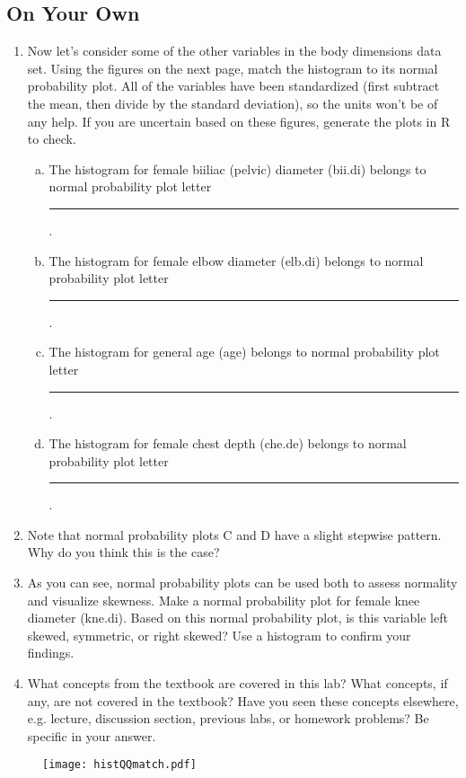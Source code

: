 \documentclass{article}\usepackage[]{graphicx}\usepackage[]{color}
\newcommand{\hlstd}[1]{\textcolor[rgb]{0.345,0.345,0.345}{#1}}%
\begin{document}
\vspace{2cm}

\subsection*{On Your Own}

\begin{enumerate}

\item Now let's consider some of the other variables in the body dimensions data set.  Using the figures on the next page, match the histogram to its normal probability plot.  All of the variables have been standardized (first subtract the mean, then divide by the standard deviation), so the units won't be of any help.  If you are uncertain based on these figures, generate the plots in R to check.

\begin{enumerate}[(a)]

\item The histogram for female biiliac (pelvic) diameter (\hlstd{bii.di}) belongs to normal probability plot letter \rule{0.25in}{1pt}.

\item The histogram for female elbow diameter (\hlstd{elb.di}) belongs to normal probability plot letter \rule{0.25in}{1pt}.

\item The histogram for general age (\hlstd{age}) belongs to normal probability plot letter \rule{0.25in}{1pt}.

\item The histogram for female chest depth (\hlstd{che.de}) belongs to normal probability plot letter \rule{0.25in}{1pt}.

\end{enumerate}

\item Note that normal probability plots C and D have a slight stepwise pattern.  Why do you think this is the case?

\item As you can see, normal probability plots can be used both to assess normality and visualize skewness.  Make a normal probability plot for female knee diameter (\hlstd{kne.di}).  Based on this normal probability plot, is this variable left skewed, symmetric, or right skewed?  Use a histogram to confirm your findings.

\item What concepts from the textbook are covered in this lab?  What concepts, if any, are not covered in the textbook?  Have you seen these concepts elsewhere, e.g. lecture, discussion section, previous labs, or homework problems?  Be specific in your answer.

\end{enumerate}

\newpage

\begin{figure}[h]
   \centering
  \texttt{[image: histQQmatch.pdf]}
\end{figure}
\end{document}
